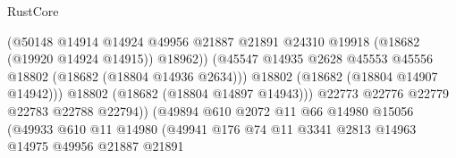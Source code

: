 \begin{lexlean}{RustCore}
\begin{coremodule}
                                                (@50148
                                                  @14914
                                                  @14924
                                                  @49956
                                                  @21887
                                                  @21891
                                                  @24310
                                                  @19918
                                                  (@18682 (@19920 @14924 @14915))
                                                  @18962))
                                              (@45547
                                                @14935
                                                @2628
                                                @45553
                                                @45556
                                                @18802
                                                (@18682 (@18804 @14936 @2634)))
                                              @18802
                                              (@18682 (@18804 @14907 @14942)))
                                            @18802
                                            (@18682 (@18804 @14897 @14943)))
                                          @22773
                                          @22776
                                          @22779
                                          @22783
                                          @22788
                                          @22794))
                                      (@49894
                                        @610
                                        @2072
                                        @11
                                        @66
                                        @14980
                                        @15056
                                        (@49933
                                          @610
                                          @11
                                          @14980
                                          (@49941
                                            @176
                                            @74
                                            @11
                                            @3341
                                            @2813
                                            @14963
                                            @14975
                                            @49956
                                            @21887
                                            @21891

\end{coremodule}
\end{lexlean}
